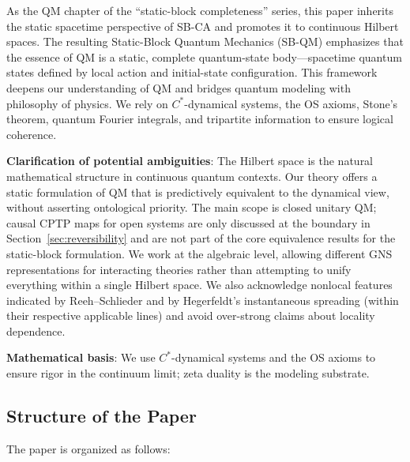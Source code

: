 \documentclass[11pt]{article}
\theoremstyle{definition}
\theoremstyle{remark}
\begin{document}
As the QM chapter of the ``static-block completeness'' series, this paper inherits the static spacetime perspective of SB-CA and promotes it to continuous Hilbert spaces. The resulting Static-Block Quantum Mechanics (SB-QM) emphasizes that the essence of QM is a static, complete quantum-state body---spacetime quantum states defined by local action and initial-state configuration. This framework deepens our understanding of QM and bridges quantum modeling with philosophy of physics. We rely on \( C^* \)-dynamical systems, the OS axioms, Stone's theorem, quantum Fourier integrals, and tripartite information to ensure logical coherence.

\textbf{Clarification of potential ambiguities}: The Hilbert space is the natural mathematical structure in continuous quantum contexts. Our theory offers a static formulation of QM that is predictively equivalent to the dynamical view, without asserting ontological priority. The main scope is closed unitary QM; causal CPTP maps for open systems are only discussed at the boundary in Section~\ref{sec:reversibility} and are not part of the core equivalence results for the static-block formulation. We work at the algebraic level, allowing different GNS representations for interacting theories rather than attempting to unify everything within a single Hilbert space. We also acknowledge nonlocal features indicated by Reeh--Schlieder and by Hegerfeldt's instantaneous spreading (within their respective applicable lines) and avoid over-strong claims about locality dependence.

\textbf{Mathematical basis}: We use \( C^* \)-dynamical systems and the OS axioms to ensure rigor in the continuum limit; zeta duality is the modeling substrate.

\subsection{Structure of the Paper}

The paper is organized as follows:
\end{document}
